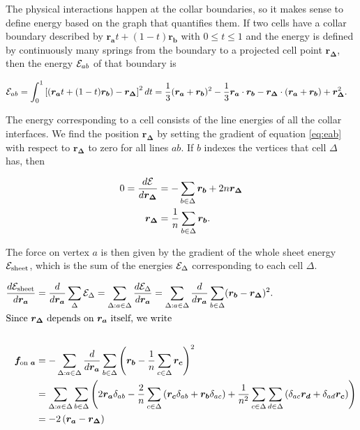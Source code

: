 The physical interactions happen at the collar boundaries, so it makes sense to define energy based on the graph that quantifies them. If two cells have a collar boundary described by $\bm{r_a} t + (1-t)\bm{r_b}$ with $0 \leq t \leq 1$ and the energy is defined by continuously many springs from the boundary to a projected cell point $\bm{r_\Delta}$, then the energy $\mathcal{E}_{ab}$ of that boundary is 

\begin{align}
    \mathcal{E}_{ab} = \int_0^1 \left[(\bm{r_a}t + (1-t)\bm{r_b}) - \bm{r_\Delta} \right]^2 dt &= \frac{1}{3} (\bm{r_a} + \bm{r_b})^2 - \frac{1}{3} \bm{r_a}\cdot\bm{r_b} - \bm{r_\Delta} \cdot (\bm{r_a} + \bm{r_b}) + \bm{r_\Delta}^2. \label{eq:eab}
\end{align}

The energy corresponding to a cell consists of the line energies of all the collar interfaces. We find the position $\bm{r_\Delta}$ by setting the gradient of equation \ref{eq:eab} with respect to $\bm{r_\Delta}$ to zero for all lines $ab$. If $b$ indexes the vertices that cell $\Delta$ has, then 

\begin{align*}
    0 = \frac{d\mathcal{E}}{d\bm{r_\Delta}} &= -\sum_{b\in\Delta} \bm{r_b} + 2n\bm{r_\Delta} \\
    \bm{r_\Delta} &= \frac{1}{n} \sum_{b\in\Delta} \bm{r_b}.
\end{align*}

The force on vertex $a$ is then given by the gradient of the whole sheet energy $\mathcal{E}_{\text{sheet}}$, which is the sum of the energies $\mathcal{E}_\Delta$ corresponding to each cell $\Delta$. 

\begin{align*}
    \frac{d \mathcal{E}_{\text{sheet}}}{d\bm{r_a}} &= \frac{d}{d\bm{r_a}} \sum_\Delta \mathcal{E}_\Delta = \sum_{\Delta:a \in \Delta} \frac{d\mathcal{E}_\Delta}{d\bm{r_a}} = \sum_{\Delta:a\in\Delta} \frac{d}{d\bm{r_a}} \sum_{b \in \Delta} (\bm{r_b} - \bm{r_\Delta})^2. \\
    \intertext{Since $\bm{r_\Delta}$ depends on $\bm{r_a}$ itself, we write} \\
    \bm{f_{\text{on }a}} &= -\sum_{\Delta:a\in\Delta} \frac{d}{d\bm{r_a}} \sum_{b \in \Delta} \left(\bm{r_b} - \frac{1}{n} \sum_{c\in\Delta} \bm{r_c} \right)^2 \\
    &= \sum_{\Delta:a\in\Delta} \sum_{b \in \Delta} \left(2\bm{r_a}\delta_{ab} - \frac{2}{n} \sum_{c\in\Delta}\left(\bm{r_c}\delta_{ab} + \bm{r_b}\delta_{ac}\right) + \frac{1}{n^2} \sum_{c\in\Delta}\sum_{d\in\Delta} \left(\delta_{ac}\bm{r_d} + \delta_{ad}\bm{r_c} \right) \right) \\
    &= -2\left(\bm{r_a} - \bm{r_\Delta} \right)
\end{align*}


